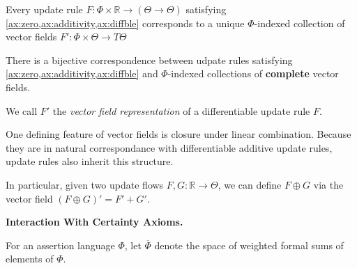 \documentclass{article}
\newcommand{\ext}[1]{\overline #1} %
\begin{document}
\begin{theorem}
    Every update rule $F : \Phi \times \mathbb R \to (\Theta  \to \Theta)$
    satisfying \cref{ax:zero,ax:additivity,ax:diffble} corresponds to a unique 
    $\Phi$-indexed collection of vector fields
        $F' : \Phi \times \Theta \to T\Theta$
\end{theorem}
\begin{coro}\label{thm:vecrep}
    There is a bijective correspondence between udpate rules satisfying \cref{ax:zero,ax:additivity,ax:diffble} and $\Phi$-indexed collections of \textbf{complete} vector fields.
\end{coro}

We call $F'$ the \emph{vector field representation} of a differentiable update rule $F$.

One defining feature of vector fields is closure under linear
    combination.
Because they are in natural correspondance with differentiable additive update rules, update rules also inherit this structure.

In particular, given two update flows $F, G : \mathbb R \to \Theta$, we can define
$F \oplus G$ via the vector field $(F \oplus G)' = F' + G'$.

\begin{wip}
    \textbf{Interaction With Certainty Axioms.}
    
\end{wip}

\begin{defn}
    For an assertion language $\Phi$, let $\ext\Phi$ denote
    the space of weighted formal sums of elements of $\Phi$.
\end{defn}
\end{document}
